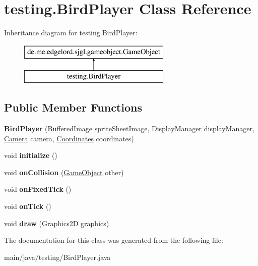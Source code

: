 \hypertarget{classtesting_1_1_bird_player}{}\section{testing.\+Bird\+Player Class Reference}
\label{classtesting_1_1_bird_player}
Inheritance diagram for testing.\+Bird\+Player\+:\begin{figure}[H]
\begin{center}
\leavevmode
\includegraphics[height=2.000000cm]{classtesting_1_1_bird_player}
\end{center}
\end{figure}
\subsection*{Public Member Functions}
\begin{DoxyCompactItemize}
\item 
\mbox{\label{classtesting_1_1_bird_player_aca80faa9744b8cc0240f2a17914430e2}} 
{\bfseries Bird\+Player} (Buffered\+Image sprite\+Sheet\+Image, \mbox{\hyperlink{classde_1_1me_1_1edgelord_1_1sjgl_1_1display_1_1_display_manager}{Display\+Manager}} display\+Manager, \mbox{\hyperlink{classde_1_1me_1_1edgelord_1_1sjgl_1_1camera_1_1_camera}{Camera}} camera, \mbox{\hyperlink{classde_1_1me_1_1edgelord_1_1sjgl_1_1location_1_1_coordinates}{Coordinates}} coordinates)
\item 
\mbox{\label{classtesting_1_1_bird_player_adf9252986fcf45ce66b8ecbee5c59cad}} 
void {\bfseries initialize} ()
\item 
\mbox{\label{classtesting_1_1_bird_player_aaa01a2bfd375ced7aeda25f6606b07ab}} 
void {\bfseries on\+Collision} (\mbox{\hyperlink{classde_1_1me_1_1edgelord_1_1sjgl_1_1gameobject_1_1_game_object}{Game\+Object}} other)
\item 
\mbox{\label{classtesting_1_1_bird_player_ad8affef356aaf4316ca52e792873ec8a}} 
void {\bfseries on\+Fixed\+Tick} ()
\item 
\mbox{\label{classtesting_1_1_bird_player_a64aa32a93a8d59a30a6ea996236d47e2}} 
void {\bfseries on\+Tick} ()
\item 
\mbox{\label{classtesting_1_1_bird_player_aa799db381f9fdf08ee59c51eaffb8423}} 
void {\bfseries draw} (Graphics2D graphics)
\end{DoxyCompactItemize}


The documentation for this class was generated from the following file\+:\begin{DoxyCompactItemize}
\item 
main/java/testing/Bird\+Player.\+java\end{DoxyCompactItemize}
